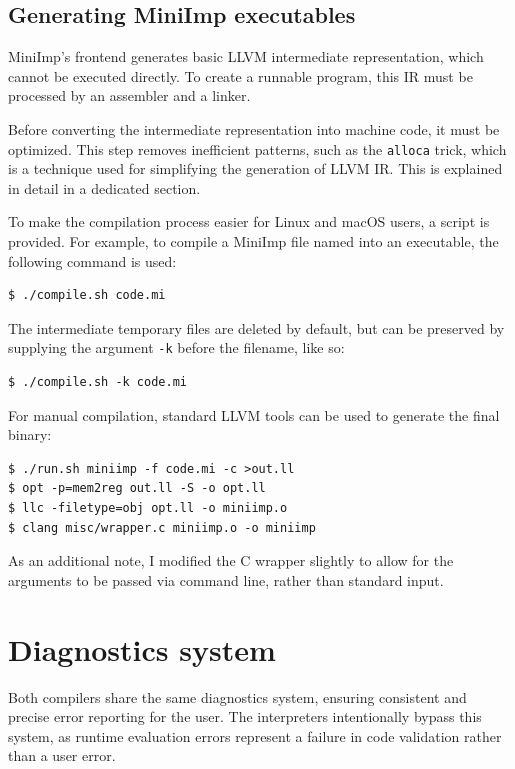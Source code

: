 \documentclass[12pt]{article}
\begin{document}
\subsection{Generating MiniImp executables}

MiniImp's frontend generates basic LLVM intermediate representation, which
cannot be executed directly. To create a runnable program, this IR must be
processed by an assembler and a linker.

Before converting the intermediate representation into machine code, it must be
optimized. This step removes inefficient patterns, such as the \texttt{alloca}
trick, which is a technique used for simplifying the generation of LLVM IR. This
is explained in detail in a dedicated section.

To make the compilation process easier for Linux and macOS users, a
 script is provided. For example, to compile a MiniImp file
named  into an executable, the following command is used:
\begin{verbatim}
$ ./compile.sh code.mi
\end{verbatim}

The intermediate temporary files are deleted by default, but can be preserved by
supplying the argument \texttt{-k} before the filename, like so:
\begin{verbatim}
$ ./compile.sh -k code.mi
\end{verbatim}

For manual compilation, standard LLVM tools can be used to generate the final
 binary:
\begin{verbatim}
$ ./run.sh miniimp -f code.mi -c >out.ll
$ opt -p=mem2reg out.ll -S -o opt.ll
$ llc -filetype=obj opt.ll -o miniimp.o
$ clang misc/wrapper.c miniimp.o -o miniimp
\end{verbatim}

As an additional note, I modified the C wrapper slightly to allow for the
arguments to be passed via command line, rather than standard input.

\section{Diagnostics system}

Both compilers share the same diagnostics system, ensuring consistent and
precise error reporting for the user. The interpreters intentionally bypass this
system, as runtime evaluation errors represent a failure in code validation
rather than a user error.
\end{document}
